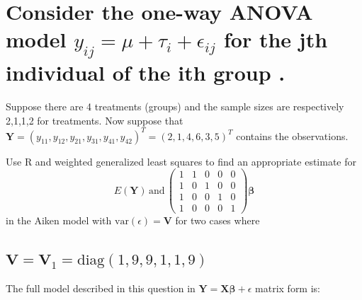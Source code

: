 \documentclass[11pt]{article}
\begin{document}
\section{Consider the one-way ANOVA model $y_{ij} = \mu + \tau_i + \epsilon_{ij}$ for the jth individual of the ith group .}
\label{sec-2}

Suppose there are 4 treatments (groups) and the sample sizes are 
respectively 2,1,1,2 for treatments.
Now suppose that $\mathbf{Y} = (y_{11}, y_{12}, y_{21}, y_{31},
y_{41}, y_{42})^{T} = (2, 1, 4, 6, 3, 5)^{T}$ contains the observations.

Use R and weighted generalized least squares to find an appropriate 
estimate for
$$E(\mathbf{Y})\,\mathrm{and}\,
\begin{pmatrix}
1 & 1 & 0 & 0 & 0 \\
1 & 0 & 1 & 0 & 0 \\
1 & 0 & 0 & 1 & 0 \\
1 & 0 & 0 & 0 & 1 
\end{pmatrix}\mathbf{\beta}$$
in the Aiken model with $\mathrm{var}(\epsilon) = \mathbf{V}$ for two
cases where
 
\subsection{$\mathbf{V} = \mathbf{V}_1 = \mathrm{diag}(1,9,9,1,1,9)$}
\label{sec-2-1}



The full model described in this question in 
$\mathbf{Y}=\mathbf{X\beta}+\epsilon$ matrix form is:
\end{document}
